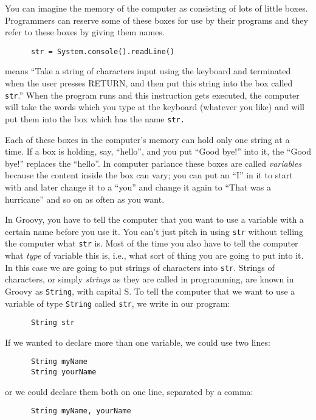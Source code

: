 You can imagine the memory of the computer as consisting of lots of
little boxes.  Programmers can reserve some of these boxes for
use by their programs and they refer to these boxes by giving
them names.  

\begin{Verbatim}
      str = System.console().readLine()
\end{Verbatim}

means ``Take a string of characters input using the keyboard and
terminated when the user presses RETURN, and
then put this string into the box called \verb!str!.''  When the program runs and
this instruction gets executed, the computer will take the words which
you type at the keyboard (whatever you like) and will put them into
the box which has the name \verb!str.!

Each of these boxes in the computer's memory can hold only one string at a time.  If a box is
holding, say, ``hello'', and you put ``Good bye!'' into it, the
``Good bye!'' replaces the ``hello''.  In computer parlance these
boxes are called \emph{variables} because the content inside the box
can vary; you can put an ``I'' in it to start with and later change it
to a ``you'' and change it again to ``That was a hurricane'' and so on
as often as you want.

In Groovy, you have to tell the computer that you want to use a variable
with a certain name before you use it.  You can't just pitch in using \verb!str!
without telling the computer what \verb!str! is.  Most of the time you also have to
tell the computer what {\em type} of variable this is, i.e., what sort of thing you are going
to put into it. In this case we are going to put strings of characters into \verb!str!. 
Strings of characters, or simply \emph{strings} as they are called in programming, are
known in Groovy as \verb!String!, with capital S.  To tell the computer that we want to use a
variable of type \verb!String! called \verb!str!, we write in our program:

\begin{Verbatim}
      String str
\end{Verbatim}

If we wanted to declare more than one variable, we could use two lines:

\begin{Verbatim}
      String myName
      String yourName
\end{Verbatim}

or we could declare them both on one line, separated by a comma:
\begin{Verbatim}
      String myName, yourName
\end{Verbatim}

